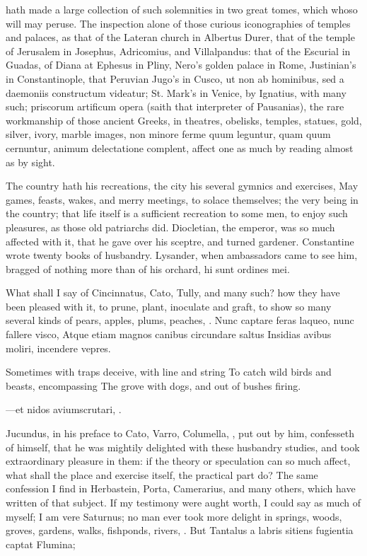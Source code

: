 {hath made a large collection of such solemnities in two great tomes,
which whoso will may peruse. The inspection alone of those curious
iconographies of temples and palaces, as that of the Lateran church in
Albertus Durer, that of the temple of Jerusalem in Josephus,
Adricomius, and Villalpandus: that of the Escurial in Guadas, of Diana
at Ephesus in Pliny, Nero's golden palace in Rome, Justinian's in
Constantinople, that Peruvian Jugo's in Cusco, ut non ab
hominibus, sed a daemoniis constructum videatur; St. Mark's in Venice,
by Ignatius, with many such; priscorum artificum opera (saith that
interpreter of Pausanias), the rare workmanship of those ancient
Greeks, in theatres, obelisks, temples, statues, gold, silver, ivory,
marble images, non minore ferme quum leguntur, quam quum cernuntur,
animum delectatione complent, affect one as much by reading almost as
by sight.

The country hath his recreations, the city his several gymnics and
exercises, May games, feasts, wakes, and merry meetings, to solace
themselves; the very being in the country; that life itself is a
sufficient recreation to some men, to enjoy such pleasures, as those
old patriarchs did. Diocletian, the emperor, was so much affected with
it, that he gave over his sceptre, and turned gardener. Constantine
wrote twenty books of husbandry. Lysander, when ambassadors came to see
him, bragged of nothing more than of his orchard, hi sunt ordines mei.

What shall I say of Cincinnatus, Cato, Tully, and many such? how they
have been pleased with it, to prune, plant, inoculate and graft, to
show so many several kinds of pears, apples, plums, peaches, \etc{}.
Nunc captare feras laqueo, nunc fallere visco,
Atque etiam magnos canibus circundare saltus
Insidias avibus moliri, incendere vepres.

Sometimes with traps deceive, with line and string
To catch wild birds and beasts, encompassing
The grove with dogs, and out of bushes firing.

---et nidos aviumscrutari, \etc{}.

Jucundus, in his preface to Cato, Varro, Columella, \etc{}, put out by
him, confesseth of himself, that he was mightily delighted with these
husbandry studies, and took extraordinary pleasure in them: if the
theory or speculation can so much affect, what shall the place and
exercise itself, the practical part do? The same confession I find in
Herbastein, Porta, Camerarius, and many others, which have written of
that subject. If my testimony were aught worth, I could say as much of
myself; I am vere Saturnus; no man ever took more delight in springs,
woods, groves, gardens, walks, fishponds, rivers, \etc{}. But
Tantalus a labris sitiens fugientia captat
Flumina;

}
